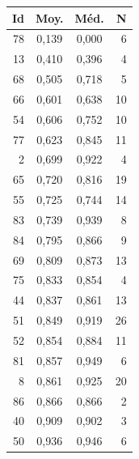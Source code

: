\documentclass[12pt,a4paper]{report}
\begin{document}
\begin{minipage}[t]{0.48\textwidth}
\centering
\begin{tabular}{rccr}
\toprule
\textbf{Id} & \textbf{Moy.} & \textbf{Méd.} & \textbf{N} \\
\midrule
78 & 0,139 & 0,000 & 6 \\
13 & 0,410 & 0,396 & 4 \\
68 & 0,505 & 0,718 & 5 \\
66 & 0,601 & 0,638 & 10 \\
54 & 0,606 & 0,752 & 10 \\
77 & 0,623 & 0,845 & 11 \\
2 & 0,699 & 0,922 & 4 \\
65 & 0,720 & 0,816 & 19 \\
55 & 0,725 & 0,744 & 14 \\
83 & 0,739 & 0,939 & 8 \\
84 & 0,795 & 0,866 & 9 \\
69 & 0,809 & 0,873 & 13 \\
75 & 0,833 & 0,854 & 4 \\
44 & 0,837 & 0,861 & 13 \\
51 & 0,849 & 0,919 & 26 \\
52 & 0,854 & 0,884 & 11 \\
81 & 0,857 & 0,949 & 6 \\
8 & 0,861 & 0,925 & 20 \\
86 & 0,866 & 0,866 & 2 \\
40 & 0,909 & 0,902 & 3 \\
50 & 0,936 & 0,946 & 6 \\
\bottomrule
\end{tabular}
\end{minipage}
\endgroup
\end{document}

